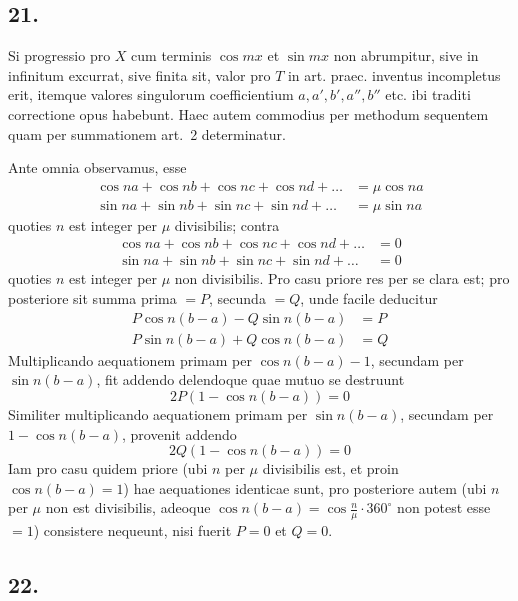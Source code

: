 \documentclass[12pt,a4paper]{article}
\theoremstyle{plain}
\begin{document}
\subsection*{21.}

Si progressio pro $X$ cum terminis $\cos mx$ et $\sin mx$ non abrumpitur, sive in infinitum excurrat, sive finita sit, valor pro $T$ in art. praec. inventus incompletus
erit, itemque valores singulorum coefficientium $a, a', b', a'', b''$ etc. ibi traditi correctione opus habebunt. Haec autem commodius per methodum sequentem quam per
summationem art.\ 2 determinatur.

Ante omnia observamus, esse
\begin{align*}
\cos na + \cos nb + \cos nc + \cos nd + \ldots &= \mu\cos na\\
\sin na + \sin nb + \sin nc + \sin nd + \ldots &= \mu\sin na
\end{align*}
quoties $n$ est integer per $\mu$ divisibilis; contra
\begin{align*}
\cos na + \cos nb + \cos nc + \cos nd + \ldots &= 0\\
\sin na + \sin nb + \sin nc + \sin nd + \ldots &= 0
\end{align*}
quoties $n$ est integer per $\mu$ non divisibilis. Pro casu priore res per se clara est;
pro posteriore sit summa prima $=P$, secunda $=Q$, unde facile deducitur
\begin{align*} P\cos n(b-a) - Q\sin n(b-a) &= P\\
P\sin n(b-a) + Q\cos n(b-a) &= Q
\end{align*}
Multiplicando aequationem primam per $\cos n(b-a) - 1$, secundam per $\sin n(b-a)$,
fit addendo delendoque quae mutuo se destruunt
\[
2P(1 - \cos n(b-a)) = 0
\]
Similiter multiplicando aequationem primam per $\sin n(b-a)$, secundam per
$1 - \cos n(b-a)$, provenit addendo
\[
2Q(1 - \cos n(b-a)) = 0
\]
Iam pro casu quidem priore (ubi $n$ per $\mu$ divisibilis est, et proin $\cos n(b-a) = 1$) hae aequationes identicae sunt, pro posteriore autem (ubi $n$ per $\mu$ non est divisibilis,
adeoque $\cos n(b-a) = \cos\frac{n}{\mu}\cdot 360^{\circ}$ non potest esse $=1$) consistere nequeunt, nisi fuerit $P = 0$ et $Q = 0$.


\subsection*{22.}
\end{document}
